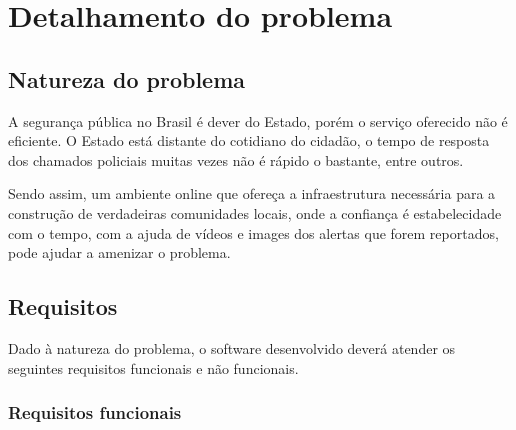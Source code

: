 \chapter{Detalhamento do problema}
\label{c.detalhamento}


\section{Natureza do problema}
\label{s.natureza-do-problema}

A segurança pública no Brasil é dever do Estado, porém o serviço oferecido não é eficiente. O Estado está distante do cotidiano do cidadão, o tempo de resposta dos chamados policiais muitas vezes não é rápido o bastante, entre outros.

Sendo assim, um ambiente online que ofereça a infraestrutura necessária para a construção de verdadeiras comunidades locais, onde a confiança é estabelecidade com o tempo, com a ajuda de vídeos e images dos alertas que forem reportados, pode ajudar a amenizar o problema.

\section{Requisitos}
\label{s.requisitos}

Dado à natureza do problema, o software desenvolvido deverá atender os seguintes requisitos funcionais e não funcionais.

\subsection{Requisitos funcionais}
\label{s.requisitos-funcionais}


